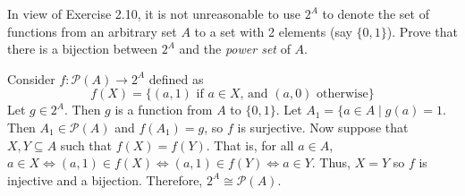 \documentclass[../../master.tex]{subfiles}
\begin{document}
  \begin{problem}
    In view of Exercise 2.10, it is not unreasonable to use \(2^{A}\) to denote the set of functions from an arbitrary set \(A\) to a set with 2 elements (say \(\{0, 1\}\)).
    Prove that there is a bijection between \(2^{A}\) and the \textit{power set} of \(A\).
  \end{problem}

  \begin{solution}
    Consider \(f: \mathscr{P} (A) \to 2^{A}\) defined as
    \begin{equation*}
      f(X) = \{(a, 1) \text{ if } a \in X \text{, and } (a, 0) \text{ otherwise} \}
    \end{equation*}
    Let \(g \in 2^{A}\). Then \(g\) is a function from \(A\) to \(\{0, 1\}\).
    Let \(A_{1} = \{a \in A \mid g(a) = 1\). Then \(A_{1} \in \mathscr{P}(A)\) and \(f(A_{1}) = g\), so \(f\) is surjective.
    Now suppose that \(X, Y \subseteq A\) such that \(f(X) = f(Y)\).
    That is, for all \(a \in A\), \(a \in X \Longleftrightarrow (a, 1) \in f(X) \Longleftrightarrow (a, 1) \in f(Y) \Longleftrightarrow a \in Y\).
    Thus, \(X = Y\) so \(f\) is injective and a bijection.
    Therefore, \(2^{A} \cong \mathscr{P}(A)\).
  \end{solution}
\end{document}

